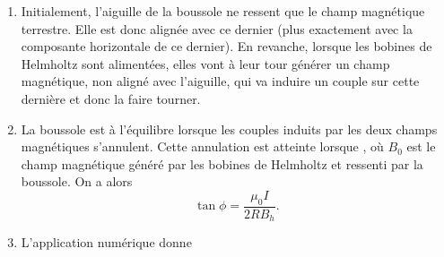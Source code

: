 \begin{corrige}
	\begin{enumerate}
		\item Initialement, l'aiguille de la boussole ne ressent que le
		  champ magnétique terrestre. Elle est donc alignée avec ce dernier
		  (plus exactement avec la composante horizontale de ce dernier).
		  En revanche, lorsque les bobines de Helmholtz sont alimentées,
		  elles vont à leur tour générer un champ magnétique, 
		  non aligné avec l'aiguille, qui va induire 
		  un couple sur cette dernière et donc la faire tourner.
		\item La boussole est à l'équilibre lorsque les couples induits
		  par les deux champs magnétiques s'annulent. Cette annulation
		  est atteinte lorsque , où
		  $B_0$ est le champ magnétique généré par les bobines de Helmholtz
		  et ressenti par la boussole. On a alors
		  \begin{equation*}
			  \boxed{\tan \phi = \dfrac{\mu_0 I}{2 R B_h}.}
		  \end{equation*}
	  \item L'application numérique donne 
\end{enumerate}
\end{corrige}

